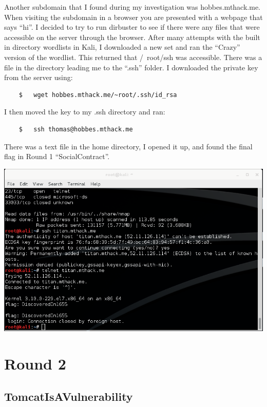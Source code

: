 \documentclass[12pt]{report}
\newcommand{\mychapter}[2]{
    \setcounter{chapter}{#1}
    \setcounter{section}{0}
    \chapter*{#2}
    \addcontentsline{toc}{chapter}{#2}
}
\begin{document}
Another subdomain that I found during my investigation was hobbes.mthack.me. When visiting the subdomain in a browser you are presented with a webpage that says ``hi''. I decided to try to run dirbuster to see if there were any files that were accessible on the server through the browser. After many attempts with the built in directory wordlists in Kali, I downloaded a new set \cite{jrivard2009} and ran the ``Crazy'' version of the wordlist. This returned that /~root/ssh was accessible. There was a file in the directory leading me to the ``.ssh'' folder. I downloaded the private key from the server using:
	\begin{verbatim}
	$	wget hobbes.mthack.me/~root/.ssh/id_rsa
	\end{verbatim}
I then moved the key to my .ssh directory and ran:
	\begin{verbatim}
	$	ssh thomas@hobbes.mthack.me
	\end{verbatim}
There was a text file in the home directory, I opened it up, and found the final flag in Round 1 ``SocialContract''.\\
\newline
\begin{center}
\includegraphics[scale=0.33]{DiscoveredIn1655.png}
\end{center}


\mychapter{2}{Round 2}
\section{TomcatIsAVulnerability}
\end{document}
